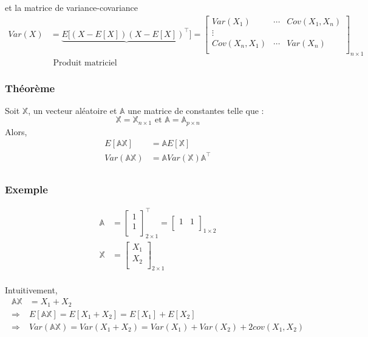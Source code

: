 \documentclass[11pt,french]{report}
\begin{document}
et la matrice de variance-covariance
\begin{align*}
Var(X) &=\underbrace{E\Big[(X -E[X])(X-E[X])^\intercal\Big]}  =
\begin{bmatrix} 
Var(X_1) &\cdots & Cov(X_1,X_n) \\
\vdots \\
Cov(X_n,X_1) & \cdots & Var(X_n)\\
\end{bmatrix}_{n \times 1}\\
& \text{\ \ \ \ \ \ Produit matriciel}
\end{align*}

\subsubsection*{Théorème}
\label{sec:theo}

Soit $\mathbb{X}$, un vecteur aléatoire et $\mathbb{A}$ une matrice de constantes telle que :
$$
\mathbb{X} = \mathbb{X}_{n \times 1} \text{ et } \mathbb{A} = \mathbb{A}_{p \times n}
$$
Alors,
\begin{align*}
E[\mathbb{AX}] &= \mathbb{A}E[\mathbb{X}] \\
Var(\mathbb{A}\mathbb{X}) &= \mathbb{A} Var(\mathbb{X})\mathbb{A}^\intercal \\
\end{align*}

\subsubsection*{Exemple}
\begin{align*}
\mathbb{A} &= 
     \begin{bmatrix} 
     1 \\
     1\\
     \end{bmatrix}_{2 \times 1}^\intercal 
  = \begin{bmatrix} 
     1 & 1 \\
     \end{bmatrix}_{1 \times 2} \\
\mathbb{X} &= 
     \begin{bmatrix} 
     X_1 \\
     X_2\\
     \end{bmatrix}_{2 \times 1}\\
\end{align*}

Intuitivement,
\begin{align*}
\mathbb{A} \mathbb{X} &= X_1 + X_2  \\
\Rightarrow & E[\mathbb{A} \mathbb{X}] = E[X_1 + X_2] = E[X_1] + E[X_2] \\
\Rightarrow & Var(\mathbb{A} \mathbb{X})= Var(X_1 + X_2) = Var(X_1) + Var(X_2) + 2cov(X_1, X_2) \\
\end{align*}
\end{document}
